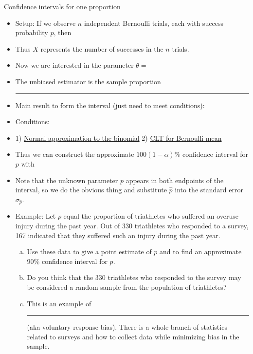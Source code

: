 \documentclass{article}
\newcommand{\blankul}[1]{\rule[-1.5mm]{#1}{0.15mm}}	%
\begin{document}
Confidence intervals for one proportion\bigskip
\begin{itemize}
    \item Setup: If we observe $n$ independent Bernoulli trials, each with success probability $p$, then \vspace{20pt}
    \item[] Thus $X$ represents the number of successes in the $n$ trials.
    \item Now we are interested in the parameter $\theta = $
    \item[] The unbiased estimator is the sample proportion \blankul{3cm}
    \item Main result to form the interval (just need to meet conditions):
    \item[] Conditions:\bigskip
    \item[] 1) \ul{Normal approximation to the binomial} \hspace{60pt} 2) \ul{CLT for Bernoulli mean}\vspace{100pt}
    \item Thus we can construct the approximate $100 (1 - \alpha)\%$ confidence interval for $p$ with\vspace{50pt}
    \item[] Note that the unknown parameter $p$ appears in both endpoints of the interval, so we do the obvious thing and substitute $\hat{p}$ into the standard error $\sigma_{\hat{p}}$.
    \item Example: Let $p$ equal the proportion of triathletes who suffered an overuse injury during the past year. Out of 330 triathletes who responded to a survey, 167 indicated that they suffered such an injury during the past year.
    \begin{enumerate}[(a)]
        \item Use these data to give a point estimate of $p$ and to find an approximate 90\% confidence interval for $p$.\vspace{100pt}
        \item Do you think that the 330 triathletes who responded to the survey may be considered a random sample from the population of triathletes?
        \item[] This is an example of \blankul{6cm} (aka voluntary response bias). There is a whole branch of statistics related to surveys and how to collect data while minimizing bias in the sample.
     \end{enumerate}
\end{itemize}\bigskip
\end{document}
